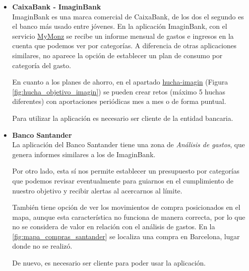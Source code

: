 \begin{itemize}

    \item \textbf{CaixaBank - ImaginBank}\cite{imagin_ahorro} \\
    ImaginBank es una marca comercial de CaixaBank, de los dos el segundo es el banco más usado entre jóvenes. 
    En la aplicación ImaginBank, con el servicio 
    \href{https://www.imagin.com/app/mymonz}{MyMonz}
    se recibe un informe mensual de gastos e ingresos en la cuenta que podemos ver por categorías. 
    A diferencia de otras aplicaciones similares, no aparece la opción de 
    establecer un plan de consumo por categoría del gasto.

    En cuanto a los planes de ahorro, en el apartado 
    \href{https://play.google.com/store/apps/details?id=com.imaginbank.app&hl=es}{hucha-imagin}
    (Figura \ref{fig:hucha_objetivo_imagin}) se pueden crear retos (máximo 5 huchas diferentes) con aportaciones periódicas mes a mes o de forma puntual.

    Para utilizar la aplicación es necesario ser cliente de la entidad bancaria.

    \item \textbf{Banco Santander}\cite{Santander}\\
    La aplicación del Banco Santander tiene una zona de \textit{Análisis de gastos}, que genera informes similares a los de ImaginBank. 

    Por otro lado, esta sí nos permite establecer un presupuesto por categorías que podemos revisar eventualmente para guiarnos en el cumplimiento de nuestro objetivo y recibir alertas al acercarnos al límite.

    También tiene opción de ver los movimientos de compra posicionados en el mapa, aunque esta característica no funciona de manera correcta, por lo que no se considera de valor en relación con el análisis de gastos. En la  \ref{fig:mapa_compras_santander} se localiza una compra en Barcelona, lugar donde no se realizó.

    De nuevo, es necesario ser cliente para poder usar la aplicación.


\end{itemize}
